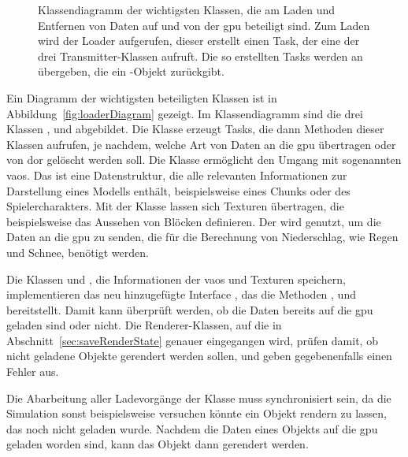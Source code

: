 \begin{figure}
	\centering
	
	\caption[Klassendiagramm der wichtigsten Klassen, die am Laden und Entfernen von Daten auf und von der  beteiligt sind.]{Klassendiagramm der wichtigsten Klassen, die am Laden und Entfernen von Daten auf und von der \ac{gpu} beteiligt sind. Zum Laden wird der Loader aufgerufen, dieser erstellt einen Task, der eine der drei Transmitter-Klassen aufruft. Die so erstellten Tasks werden an  übergeben, die ein -Objekt zurückgibt.}\label{fig:loaderDiagram}
\end{figure}
Ein Diagramm der wichtigsten beteiligten Klassen ist in Abbildung~\vref{fig:loaderDiagram} gezeigt. Im Klassendiagramm sind die drei Klassen ,  und  abgebildet. Die Klasse  erzeugt Tasks, die dann Methoden dieser Klassen aufrufen, je nachdem, welche Art von Daten an die \ac{gpu} übertragen oder von dor gelöscht werden soll. Die Klasse  ermöglicht den Umgang mit sogenannten \acp{vao}. Das ist eine Datenstruktur, die alle relevanten Informationen zur Darstellung eines Modells enthält, beispielsweise eines Chunks oder des Spielercharakters. Mit der Klasse  lassen sich Texturen übertragen, die beispielsweise das Aussehen von Blöcken definieren. Der  wird genutzt, um die Daten an die \ac{gpu} zu senden, die für die Berechnung von Niederschlag, wie Regen und Schnee, benötigt werden.

Die Klassen  und , die Informationen der \acp{vao} und Texturen speichern, implementieren das neu hinzugefügte Interface , das die Methoden 	, 
 und 
 bereitstellt. Damit kann überprüft werden, ob die Daten bereits auf die \ac{gpu} geladen sind oder nicht. Die Renderer-Klassen, auf die in Abschnitt~\ref{sec:saveRenderState} genauer eingegangen wird, prüfen damit, ob nicht geladene Objekte gerendert werden sollen, und geben gegebenenfalls einen Fehler aus.

Die Abarbeitung aller Ladevorgänge der Klasse  muss synchronisiert sein, da die Simulation sonst beispielsweise versuchen könnte ein Objekt rendern zu lassen, das noch nicht geladen wurde. Nachdem die Daten eines Objekts auf die \ac{gpu} geladen worden sind, kann das Objekt dann gerendert werden.

